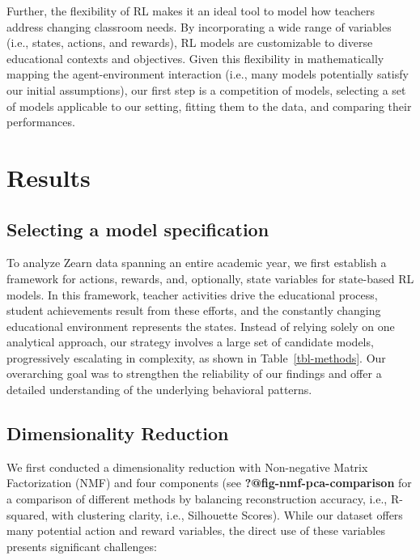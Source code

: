 \documentclass[
  number,
  preprint,
  3p,
  onecolumn]{elsarticle}
\begin{document}
Further, the flexibility of RL makes it an ideal tool to model how
teachers address changing classroom needs. By incorporating a wide range
of variables (i.e., states, actions, and rewards), RL models are
customizable to diverse educational contexts and objectives. Given this
flexibility in mathematically mapping the agent-environment interaction
(i.e., many models potentially satisfy our initial assumptions), our
first step is a competition of models, selecting a set of models
applicable to our setting, fitting them to the data, and comparing their
performances.

\section{Results}\label{results}

\subsection{Selecting a model
specification}\label{selecting-a-model-specification}

To analyze Zearn data spanning an entire academic year, we first
establish a framework for actions, rewards, and, optionally, state
variables for state-based RL models. In this framework, teacher
activities drive the educational process, student achievements result
from these efforts, and the constantly changing educational environment
represents the states. Instead of relying solely on one analytical
approach, our strategy involves a large set of candidate models,
progressively escalating in complexity, as shown in
Table~\ref{tbl-methods}. Our overarching goal was to strengthen the
reliability of our findings and offer a detailed understanding of the
underlying behavioral patterns.

\subsection{Dimensionality Reduction}\label{dimensionality-reduction}

We first conducted a dimensionality reduction with Non-negative Matrix
Factorization (NMF) and four components (see
\textbf{?@fig-nmf-pca-comparison} for a comparison of different methods
by balancing reconstruction accuracy, i.e., R-squared, with clustering
clarity, i.e., Silhouette Scores). While our dataset offers many
potential action and reward variables, the direct use of these variables
presents significant challenges:
\end{document}
